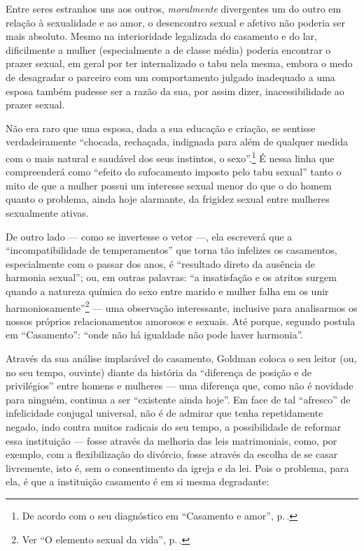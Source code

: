 Entre seres estranhos uns aos outros, \emph{moralmente} divergentes um do
outro em relação à sexualidade e ao amor, o desencontro sexual
e afetivo não poderia ser mais absoluto. Mesmo na interioridade
legalizada do casamento e do lar, dificilmente a mulher (especialmente
a de classe média) poderia encontrar o prazer sexual, em
geral por ter internalizado o tabu nela mesma, embora
o medo de desagradar o parceiro com um comportamento julgado
inadequado a uma esposa também pudesse ser a razão da sua, por assim dizer,
inacessibilidade ao prazer sexual.

Não era raro que uma esposa, dada a sua educação e
criação, se sentisse verdadeiramente ``chocada, rechaçada, indignada
para além de qualquer medida com o mais natural e saudável dos seus
instintos, o sexo''.\footnote{De acordo com o seu diagnóstico em
``Casamento e amor'', p.\,\pageref{artesao}.}
É nessa linha que compreenderá como ``efeito do
sufocamento imposto pelo tabu sexual'' tanto o mito de que a mulher
possui um interesse sexual menor do que o do homem quanto o problema,
ainda hoje alarmante, da frigidez sexual entre mulheres sexualmente
ativas.

De outro lado --- como se invertesse o vetor ---,
ela escreverá que a
``incompatibilidade de temperamentos'' que torna tão infelizes os
casamentos, especialmente com o passar dos anos, é ``resultado direto da
ausência de harmonia sexual''; ou, em outras palavras: ``a insatisfação
e os atritos surgem quando a natureza química do sexo entre marido e
mulher falha em os unir harmoniosamente''\footnote{Ver ``O elemento sexual da vida'', p.\,\pageref{unir}.} --- uma observação
interessante, inclusive para analisarmos os nossos próprios
relacionamentos amorosos e sexuais. Até porque, segundo postula em
``Casamento'': ``onde não há igualdade não pode haver harmonia''.

Através da sua análise implacável do casamento, Goldman coloca o seu
leitor (ou, no seu tempo, ouvinte) diante da história da ``diferença de
posição e de privilégios'' entre homens e mulheres ---
uma diferença que, como não é novidade para ninguém, continua a ser
``existente ainda hoje''. Em face de tal ``afresco'' de infelicidade
conjugal universal, não é de admirar que tenha repetidamente negado,
indo contra muitos radicais do seu tempo, a possibilidade de reformar
essa instituição --- fosse através da melhoria das leis
matrimoniais, como, por exemplo, com a flexibilização do divórcio, fosse
através da escolha de se casar livremente, isto é, sem o consentimento
da igreja e da lei. Pois o problema, para ela, é que a instituição
casamento é em si mesma degradante:

